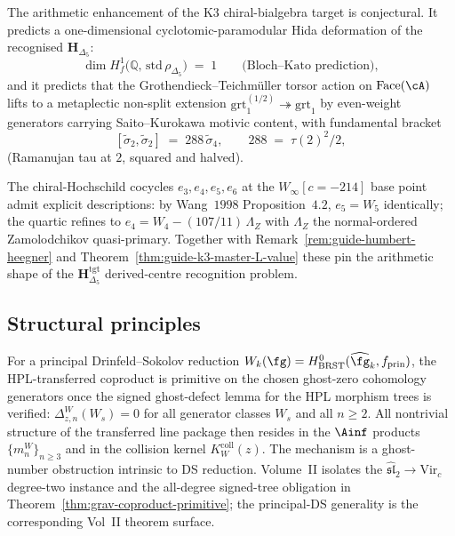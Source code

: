 \begin{remark}
\label{rem:guide-selmer-metaplectic}
The arithmetic enhancement of the K3 chiral-bialgebra target is
conjectural.
It predicts a one-dimensional cyclotomic-paramodular Hida deformation
of the recognised \(\mathbf H_{\Delta_5}\):
\[
\dim H^1_f\bigl(\mathbb Q,\,\mathrm{std}\,\rho_{\Delta_5}\bigr)
\;=\; 1
\qquad\text{(Bloch--Kato prediction)},
\]
and it predicts that the Grothendieck--Teichm\"uller torsor action on
$\mathrm{Face}(\cA)$ lifts to a metaplectic non-split extension
$\mathrm{grt}_1^{(1/2)} \twoheadrightarrow \mathrm{grt}_1$ by
even-weight generators carrying Saito--Kurokawa motivic content,
with fundamental bracket
\[
[\widetilde\sigma_2,\widetilde\sigma_2] \;=\; 288\,\widetilde\sigma_4,
\qquad
288 \;=\; \tau(2)^2/2,
\]
(Ramanujan tau at $2$, squared and halved).
\end{remark}

\begin{remark}[Chiral-Hochschild $W_\infty\lbrack c=-214\rbrack$ cocycles]
\label{rem:guide-hochschild-cocycles}
The chiral-Hochschild cocycles $e_3,e_4,e_5,e_6$ at the
$W_\infty[c=-214]$ base point admit explicit descriptions: by
Wang~$1998$ Proposition~$4.2$, $e_5 = W_5$ identically; the
quartic refines to $e_4 = W_4 - (107/11)\,\Lambda_Z$ with
$\Lambda_Z$ the normal-ordered Zamolodchikov quasi-primary. Together
with Remark~\ref{rem:guide-humbert-heegner} and
Theorem~\ref{thm:guide-k3-master-L-value} these pin the arithmetic
shape of the \(\mathbf H_{\Delta_5}^{\mathrm{tgt}}\) derived-centre
recognition problem.
\end{remark}

\subsection*{Structural principles}

\begin{principle}
\label{princ:guide-gravitational-primitivity}
For a principal Drinfeld--Sokolov reduction
$W_k(\fg) = H^0_{\mathrm{BRST}}(\widehat{\fg}_k, f_{\mathrm{prin}})$,
the HPL-transferred coproduct is primitive on the chosen
ghost-zero cohomology generators once the signed ghost-defect lemma
for the HPL morphism trees is verified:
$\Delta_{z,n}^W(W_s)=0$ for all generator classes \(W_s\) and
all \(n\ge2\). All nontrivial structure of the transferred line package
then resides in the $\Ainf$ products $\{m_n^W\}_{n \ge 3}$ and in
the collision kernel $K_W^{\mathrm{coll}}(z)$. The mechanism is a ghost-number
obstruction intrinsic to DS reduction. Volume~II isolates the
\(\widehat{\mathfrak{sl}}_2\to\mathrm{Vir}_c\) degree-two instance and
the all-degree signed-tree obligation in
Theorem~\ref{thm:grav-coproduct-primitive}; the principal-DS
generality is the corresponding Vol~II theorem surface.
\end{principle}

